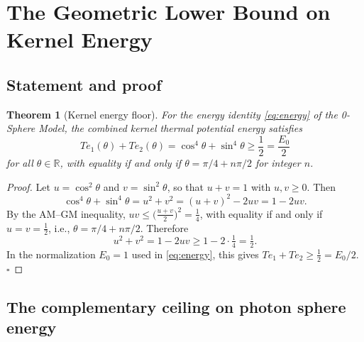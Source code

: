 \documentclass[%
 reprint, amsmath,amssymb, aps, prb, ]{revtex4-2}
\numberwithin{equation}{section}
\newtheorem{theorem}{Theorem}[section]
\begin{document}
\section{The Geometric Lower Bound on Kernel Energy}
\label{sec:floor}

\subsection{Statement and proof}

\begin{theorem}[Kernel energy floor]
\label{thm:floor}
For the energy identity \eqref{eq:energy} of the 0-Sphere Model, the combined kernel thermal potential energy satisfies
\begin{equation}
Te_1(\theta) + Te_2(\theta) = \cos^4\theta + \sin^4\theta \geq \frac{1}{2} = \frac{E_0}{2}
\label{eq:floor}
\end{equation}
for all $\theta \in \mathbb{R}$, with equality if and only if $\theta = \pi/4 + n\pi/2$ for integer $n$.
\end{theorem}

\begin{proof}
Let $u = \cos^2\theta$ and $v = \sin^2\theta$, so that $u + v = 1$ with $u, v \geq 0$. Then
\begin{equation}
\cos^4\theta + \sin^4\theta = u^2 + v^2 = (u+v)^2 - 2uv = 1 - 2uv.
\label{eq:proof_step1}
\end{equation}
By the AM--GM inequality, $uv \leq \bigl(\tfrac{u+v}{2}\bigr)^2 = \tfrac{1}{4}$, with equality if and only if $u = v = \tfrac{1}{2}$, i.e., $\theta = \pi/4 + n\pi/2$. Therefore
\begin{equation}
u^2 + v^2 = 1 - 2uv \geq 1 - 2 \cdot \tfrac{1}{4} = \tfrac{1}{2}.
\label{eq:proof_step2}
\end{equation}
In the normalization $E_0 = 1$ used in \eqref{eq:energy}, this gives $Te_1 + Te_2 \geq \tfrac{1}{2} = E_0/2$. $\square$
\end{proof}

\subsection{The complementary ceiling on photon sphere energy}
\end{document}
